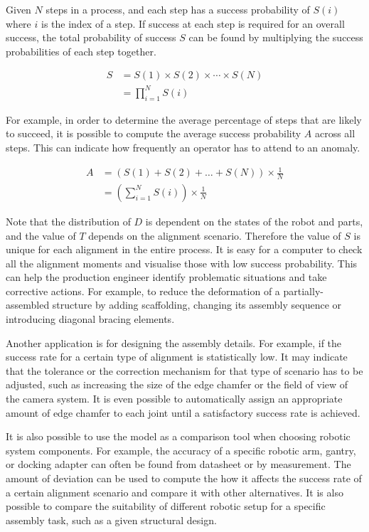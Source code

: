 Given $N$ steps in a process, and each step has a success probability of $S(i)$ where $i$ is the index of a step. If success at each step is required for an overall success, the total probability of success $S$ can be found by multiplying the success probabilities of each step together.

\begin{align} \label{eq:total-probability-success}
    S &= S(1) \times S(2) \times \cdots \times S(N)\nonumber \\
      &= \prod_{i=1}^{N} S(i)
\end{align}

For example, in order to determine the average percentage of steps that are likely to succeed, it is possible to compute the average success probability $A$ across all steps. This can indicate how frequently an operator has to attend to an anomaly.

\begin{align} \label{eq:average-step-success-probability}
    A &= (S(1) + S(2) + \ldots + S(N)) \times \frac{1}{N}\nonumber \\
      &= \left(\sum_{i=1}^{N} S(i)\right) \times \frac{1}{N}
\end{align}

Note that the distribution of $D$ is dependent on the states of the robot and parts, and the value of $T$ depends on the alignment scenario. Therefore the value of $S$ is unique for each alignment in the entire process. It is easy for a computer to check all the alignment moments and visualise those with low success probability. This can help the production engineer identify problematic situations and take corrective actions. For example, to reduce the deformation of a partially-assembled structure by adding scaffolding, changing its assembly sequence or introducing diagonal bracing elements.

Another application is for designing the assembly details. For example, if the success rate for a certain type of alignment is statistically low. It may indicate that the tolerance or the correction mechanism for that type of scenario has to be adjusted, such as increasing the size of the edge chamfer or the field of view of the camera system. It is even possible to automatically assign an appropriate amount of edge chamfer to each joint until a satisfactory success rate is achieved.

It is also possible to use the model as a comparison tool when choosing robotic system components. For example, the accuracy of a specific robotic arm, gantry, or docking adapter can often be found from datasheet or by measurement. The amount of deviation can be used to compute the how it affects the success rate of a certain alignment scenario and compare it with other alternatives. It is also possible to compare the suitability of different robotic setup for a specific assembly task, such as a given structural design. 

